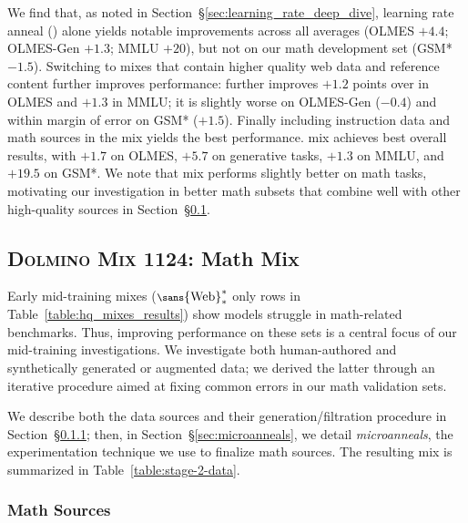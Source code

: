 \documentclass[table]{ai2style/ai2}
\newcommand{\dolminos}{\textsc{Dolmino Mix 1124}\xspace}
\begin{document}
We find that, as noted in Section~\S\ref{sec:learning_rate_deep_dive}, learning rate anneal (\MeBaseline) alone yields notable improvements across all averages (OLMES $+4.4$; OLMES-Gen $+1.3$; MMLU $+20$), but not on our math development set (GSM* $-1.5$). 
Switching to mixes that contain higher quality web data and reference content further improves performance: \MeFinewebTwo further improves $+1.2$ points over \MeBaseline in OLMES and $+1.3$ in MMLU; it is slightly worse on OLMES-Gen ($-0.4$) and within margin of error on GSM* ($+1.5$). 
Finally including instruction data and math sources in the mix yields the best performance. 
\MeFinewebTwoMathIns mix achieves best overall results, with $+1.7$ on OLMES, $+5.7$ on generative tasks, $+1.3$  on MMLU, and $+19.5$ on GSM*. 
We note that \MeFinewebTwoMath mix performs slightly better on math tasks, motivating our investigation in better math subsets that combine well with other high-quality sources in Section~\S\ref{sec:annealing_math_mix}.

\subsection{\dolminos: Math Mix}
\label{sec:annealing_math_mix}

Early mid-training mixes ($\text{\fontsize{8}{8}\sans{Web}}_{\ast}^{\ast}$ only rows in Table~\ref{table:hq_mixes_results}) show models struggle in math-related benchmarks.
Thus, improving performance on these sets is a central focus of our mid-training investigations. 
We investigate both human-authored and synthetically generated or augmented data;
we derived the latter through an iterative procedure aimed at fixing common errors in our math validation sets.

We describe both the data sources and their generation/filtration procedure in Section~\S\ref{sec:midtrain:math_sources}; 
then, in Section~\S\ref{sec:microanneals}, we detail \textit{microanneals}, the experimentation technique we use to finalize math sources. 
The resulting mix is summarized in Table~\ref{table:stage-2-data}.

\subsubsection{Math Sources}
\label{sec:midtrain:math_sources}
\end{document}
